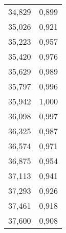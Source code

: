 \begin{longtable}{c c}
	34,829&0,899 \\
	35,026&0,921 \\
	35,223&0,957 \\
	35,420&0,976 \\
	35,629&0,989 \\
	35,797&0,996 \\
	35,942&1,000 \\
	36,098&0,997 \\
	36,325&0,987 \\
	36,574&0,971 \\
	36,875&0,954 \\
	37,113&0,941 \\
	37,293&0,926 \\
	37,461&0,918 \\
	37,600&0,908 \\
\end{longtable}
